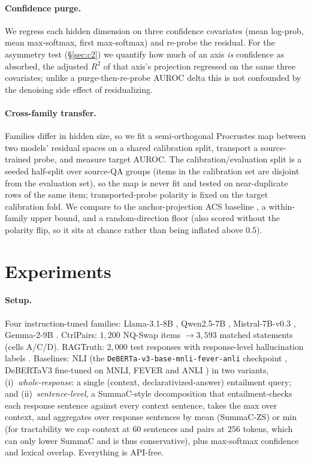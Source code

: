 \paragraph{Confidence purge.}
We regress each hidden dimension on three confidence covariates (mean log-prob, mean
max-softmax, first max-softmax) and re-probe the residual. For the asymmetry test
(\S\ref{sec:c2}) we quantify how much of an axis \emph{is} confidence as
$\mathrm{absorbed}$, the adjusted $R^2$ of that axis's projection regressed on the same
three covariates; unlike a purge-then-re-probe AUROC delta this is not confounded by the
denoising side effect of residualizing.

\paragraph{Cross-family transfer.}
Families differ in hidden size, so we fit a semi-orthogonal Procrustes map between
two models' residual spaces on a shared calibration split, transport a
source-trained probe, and measure target AUROC. The calibration/evaluation split
is a seeded half-split over source-QA groups (items in the calibration set are
disjoint from the evaluation set), so the map is never fit and tested on
near-duplicate rows of the same item; transported-probe polarity is fixed on the
target calibration fold. We compare to the
anchor-projection ACS baseline \citep{kim2026crossfamily}, a within-family upper
bound, and a random-direction floor (also scored without the polarity flip, so it
sits at chance rather than being inflated above $0.5$).

\section{Experiments}
\label{sec:experiments}

\paragraph{Setup.}
Four instruction-tuned families: Llama-3.1-8B \citep{llama31}, Qwen2.5-7B
\citep{qwen25}, Mistral-7B-v0.3 \citep{mistral7b}, Gemma-2-9B \citep{gemma2}. CtrlPairs: $1{,}200$ NQ-Swap items $\to 3{,}593$ matched statements
(cells A/C/D). RAGTruth: $2{,}000$ test responses with response-level hallucination
labels \citep{niu2024ragtruth}. Baselines: NLI (the \texttt{DeBERTa-v3-base-mnli-fever-anli} checkpoint
\citep{nli_checkpoint}, DeBERTaV3 \citep{he2023debertav3} fine-tuned on MNLI, FEVER
and ANLI \citep{mnli,fever,anli}) in two
variants, (i)~\emph{whole-response}: a single (context, declarativized-answer)
entailment query; and (ii)~\emph{sentence-level}, a SummaC-style decomposition \citep{laban2022summac}
that entailment-checks each response sentence against every context sentence, takes the
max over context, and aggregates over response sentences by mean (SummaC-ZS) or min
(for tractability we cap context at $60$ sentences and pairs at $256$ tokens, which can
only lower SummaC and is thus conservative), plus max-softmax confidence and lexical
overlap. Everything is API-free.

